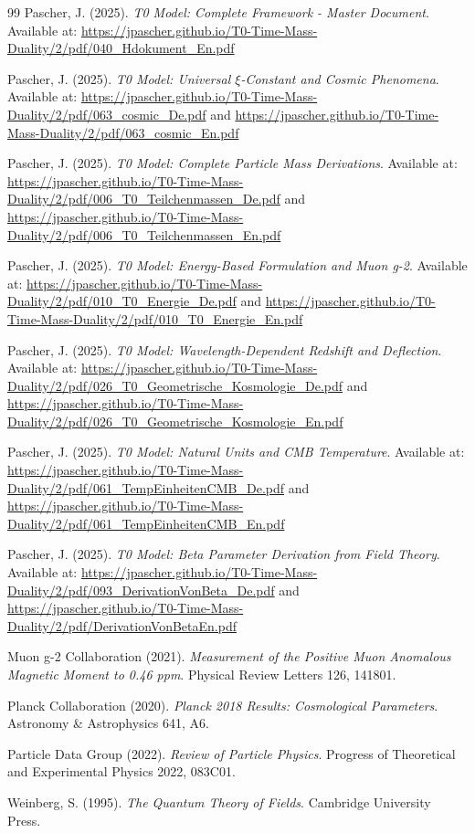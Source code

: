 \documentclass[12pt,a4paper]{report}
\begin{document}
	\begin{thebibliography}{99}
		Pascher, J. (2025). \textit{T0 Model: Complete Framework - Master Document}. Available at: \url{https://jpascher.github.io/T0-Time-Mass-Duality/2/pdf/040_Hdokument_En.pdf}
		
		Pascher, J. (2025). \textit{T0 Model: Universal $\xi$-Constant and Cosmic Phenomena}. Available at: \url{https://jpascher.github.io/T0-Time-Mass-Duality/2/pdf/063_cosmic_De.pdf} and \url{https://jpascher.github.io/T0-Time-Mass-Duality/2/pdf/063_cosmic_En.pdf}
		
		Pascher, J. (2025). \textit{T0 Model: Complete Particle Mass Derivations}. Available at: \url{https://jpascher.github.io/T0-Time-Mass-Duality/2/pdf/006_T0_Teilchenmassen_De.pdf} and \url{https://jpascher.github.io/T0-Time-Mass-Duality/2/pdf/006_T0_Teilchenmassen_En.pdf}
		
		Pascher, J. (2025). \textit{T0 Model: Energy-Based Formulation and Muon g-2}. Available at: \url{https://jpascher.github.io/T0-Time-Mass-Duality/2/pdf/010_T0_Energie_De.pdf} and \url{https://jpascher.github.io/T0-Time-Mass-Duality/2/pdf/010_T0_Energie_En.pdf}
		
		Pascher, J. (2025). \textit{T0 Model: Wavelength-Dependent Redshift and Deflection}. Available at: \url{https://jpascher.github.io/T0-Time-Mass-Duality/2/pdf/026_T0_Geometrische_Kosmologie_De.pdf} and \url{https://jpascher.github.io/T0-Time-Mass-Duality/2/pdf/026_T0_Geometrische_Kosmologie_En.pdf}
		
		Pascher, J. (2025). \textit{T0 Model: Natural Units and CMB Temperature}. Available at: \url{https://jpascher.github.io/T0-Time-Mass-Duality/2/pdf/061_TempEinheitenCMB_De.pdf} and \url{https://jpascher.github.io/T0-Time-Mass-Duality/2/pdf/061_TempEinheitenCMB_En.pdf}
		
		Pascher, J. (2025). \textit{T0 Model: Beta Parameter Derivation from Field Theory}. Available at: \url{https://jpascher.github.io/T0-Time-Mass-Duality/2/pdf/093_DerivationVonBeta_De.pdf} and \url{https://jpascher.github.io/T0-Time-Mass-Duality/2/pdf/DerivationVonBetaEn.pdf}
		
		Muon g-2 Collaboration (2021). \textit{Measurement of the Positive Muon Anomalous Magnetic Moment to 0.46 ppm}. Physical Review Letters 126, 141801.
		
		Planck Collaboration (2020). \textit{Planck 2018 Results: Cosmological Parameters}. Astronomy \& Astrophysics 641, A6.
		
		Particle Data Group (2022). \textit{Review of Particle Physics}. Progress of Theoretical and Experimental Physics 2022, 083C01.
		
		Weinberg, S. (1995). \textit{The Quantum Theory of Fields}. Cambridge University Press.
	\end{thebibliography}
\end{document}
